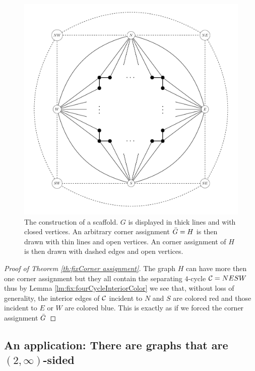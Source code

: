   \begin{figure}[h!]
  \centering
  \includegraphics[scale=0.5]{fixExtension/img/scafold}

  \caption{The construction of a scaffold. $G$ is displayed in thick lines and with closed vertices. An arbitrary corner assignment $\bar{G} =H$ is then drawn with thin lines and open vertices. An corner assignment of $H$ is then drawn with dashed edges and open vertices.
      \label{fig:scafold}}
  \end{figure}

  \begin{proof}[Proof of Theorem \ref{th:fixCorner assignment}]
    The graph $H$ can have more then one corner assignment but they all contain the separating $4$-cycle $\mathcal{C}= NESW$ thus by Lemma \ref{lm:fix:fourCycleInteriorColor} we see that, without loss of generality, the interior edges of $\mathcal{C}$ incident to $N$ and $S$ are colored red and those incident to $E$ or $W$ are colored blue. This is exactly as if we forced the corner assignment $\bar{G}$
    \end{proof}

\subsection{An application: There are graphs that are $(2, \infty)$-sided}

